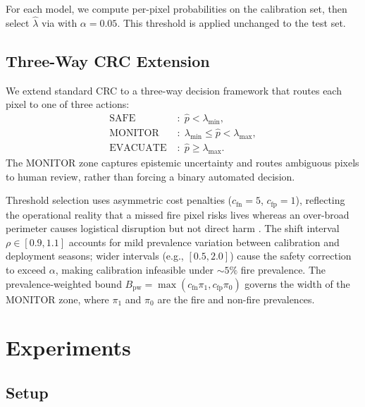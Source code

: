 \documentclass{article}
\begin{document}
For each model, we compute per-pixel probabilities on the calibration set, then select $\hat{\lambda}$ via  with $\alpha = 0.05$.
This threshold is applied unchanged to the test set.

\subsection{Three-Way CRC Extension}
\label{sec:threeway}

We extend standard CRC to a three-way decision framework that routes each pixel to one of three actions:
\begin{equation}
\begin{aligned}
\text{SAFE} \; &:\; \hat{p} < \lambda_{\min}, \\
\text{MONITOR} \; &:\; \lambda_{\min} \le \hat{p} < \lambda_{\max}, \\
\text{EVACUATE} \; &:\; \hat{p} \ge \lambda_{\max}.
\end{aligned}
\end{equation}
The MONITOR zone captures epistemic uncertainty and routes ambiguous pixels to human review, rather than forcing a binary automated decision.

Threshold selection uses asymmetric cost penalties ($c_{\mathrm{fn}}{=}5$, $c_{\mathrm{fp}}{=}1$), reflecting the operational reality that a missed fire pixel risks lives whereas an over-broad perimeter causes logistical disruption but not direct harm \citep{zhao2022evacuation}.
The shift interval $\rho \in [0.9, 1.1]$ accounts for mild prevalence variation between calibration and deployment seasons; wider intervals (e.g., $[0.5, 2.0]$) cause the safety correction to exceed $\alpha$, making calibration infeasible under ${\sim}5\%$ fire prevalence.
The prevalence-weighted bound $B_{\mathrm{pw}} = \max(c_{\mathrm{fn}} \pi_1, c_{\mathrm{fp}} \pi_0)$ governs the width of the MONITOR zone, where $\pi_1$ and $\pi_0$ are the fire and non-fire prevalences.


\section{Experiments}
\label{sec:results}

\subsection{Setup}
\end{document}
